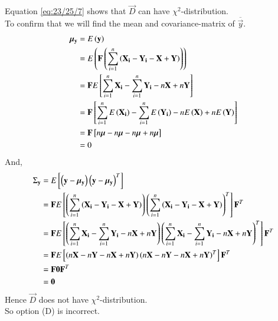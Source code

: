 \documentclass[journal,12pt,onecolumn]{IEEEtran}
\theoremstyle{remark}
\begin{document}
Equation \eqref{eq:23/25/7} shows that $\vec{D}$ can have ${\chi}^2$-distribution. \\
To confirm that we will find the mean and covariance-matrix of $\overline{\vec{y}}$.
\begin{align}
{\bm{\mu}}_{\mathbf{y}} &= E\left(\mathbf{y}\right) \\
                     &= E\left(\mathbf{F}\left(\sum_{i=1}^{n}\left(\mathbf{X_i}-\mathbf{Y_i}-\mathbf{X}+\mathbf{Y}\right)\right)\right) \\
                     &= \mathbf{F}E{}\left[\sum_{i=1}^{n}\mathbf{X_i}-\sum_{i=1}^{n}\mathbf{Y_i}-n\mathbf{X}+n\mathbf{Y}\right] \\
                     &= \mathbf{F}{}\left[\sum_{i=1}^{n}E\left(\mathbf{X_i}\right)-\sum_{i=1}^{n}E\left(\mathbf{Y_i}\right)-nE\left(\mathbf{X}\right)+nE\left(\mathbf{Y}\right)\right] \\
                     &= \mathbf{F}{}\left[n\bm{\mu}-n\bm{\mu}-n\bm{\mu}+n\bm{\mu}\right] \\
                     &= 0
\end{align}
And,
\begin{align}
{\Sigma}_{\mathbf{y}} &= E{}\left[\left(\mathbf{y}-{\bm{\mu}}_{\mathbf{y}}\right){\left(\mathbf{y}-{\bm{\mu}}_{\mathbf{y}}\right)}^T\right] \\
                   &= \mathbf{F}E{}\left[\left(\sum_{i=1}^{n}\left(\mathbf{X_i}-\mathbf{Y_i}-\mathbf{X}+\mathbf{Y}\right)\right){\left(\sum_{i=1}^{n}\left(\mathbf{X_i}-\mathbf{Y_i}-\mathbf{X}+\mathbf{Y}\right)\right)}^T\right]{\mathbf{F}}^T \\
                   &= \mathbf{F}E{}\left[\left(\sum_{i=1}^{n}\mathbf{X_i}-\sum_{i=1}^{n}\mathbf{Y_i}-n\mathbf{X}+n\mathbf{Y}\right){\left(\sum_{i=1}^{n}\mathbf{X_i}-\sum_{i=1}^{n}\mathbf{Y_i}-n\mathbf{X}+n\mathbf{Y}\right)}^T\right]{\mathbf{F}}^T \\
                   &= \mathbf{F}E{}\left[\left(n\mathbf{X}-n\mathbf{Y}-n\mathbf{X}+n\mathbf{Y}\right){\left(n\mathbf{X}-n\mathbf{Y}-n\mathbf{X}+n\mathbf{Y}\right)}^T\right]{\mathbf{F}}^T \\
                   &= \mathbf{F}\bm{0}{\mathbf{F}}^T  \\
                   &= \bm{0} 
\end{align}
Hence $\vec{D}$ does not have ${\chi}^2$-distribution.\\
So option (D) is incorrect.
\end{document}
